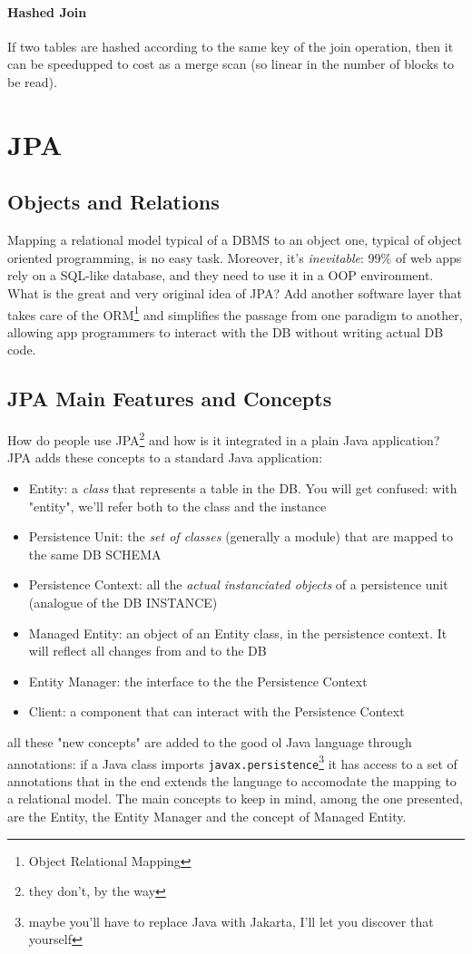 \documentclass{article}
\begin{document}
				\paragraph{Hashed Join}
					If two tables are hashed according to the same key of the join operation, then it can be speedupped to cost as a merge scan (so linear in the number of blocks to be read).


	\section{JPA}
		\subsection{Objects and Relations}
			Mapping a relational model typical of a DBMS to an object one, typical of object oriented programming, is no easy task. Moreover, it's \textit{inevitable}: 99\% of web apps rely on a SQL-like database, and they need to use it in a OOP environment. What is the great and very original idea of JPA? Add another software layer that takes care of the ORM\footnote{Object Relational Mapping} and simplifies the passage from one paradigm to another, allowing app programmers to interact with the DB without writing actual DB code.

		\subsection{JPA Main Features and Concepts}
			How do people use JPA\footnote{they don't, by the way} and how is it integrated in a plain Java application? JPA adds these concepts to a standard Java application:
			\begin{itemize}
				\item Entity: a \textit{class} that represents a table in the DB. You will get confused: with "entity", we'll refer both to the class and the instance
				\item Persistence Unit: the \textit{set of classes} (generally a module) that are mapped to the same DB SCHEMA
				\item Persistence Context: all the \textit{actual instanciated objects} of a persistence unit (analogue of the DB INSTANCE)
				\item Managed Entity: an object of an Entity class, in the persistence context. It will reflect all changes from and to the DB
				\item Entity Manager: the interface to the the Persistence Context
				\item Client: a component that can interact with the Persistence Context
			\end{itemize}
			all these "new concepts" are added to the good ol Java language through annotations: if a Java class imports \verb|javax.persistence|\footnote{maybe you'll have to replace Java with Jakarta, I'll let you discover that yourself} it has access to a set of annotations that in the end extends the language to accomodate the mapping to a relational model. The main concepts to keep in mind, among the one presented, are the Entity, the Entity Manager and the concept of Managed Entity.
\end{document}
